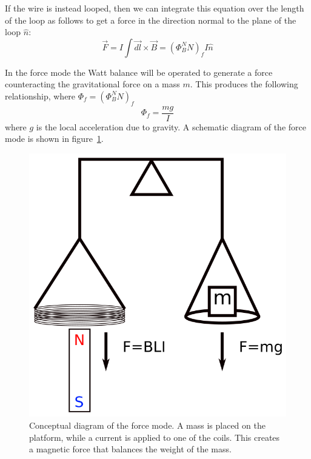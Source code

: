 \documentclass[aps,prstab,reprint,12pt]{revtex4-1}
\begin{document}
If the wire is instead looped, then we can integrate this equation over the length of the loop as follows to get a force in the direction normal to the plane of the loop $\hat{n}$:
\begin{equation}
    \vec{F} = I\int\vec{dl}\times\vec{B}  = (\Phi_B^N N)_fI \hat{n}
\end{equation}

In the force mode the Watt balance will be operated to generate a force counteracting the gravitational force on a mass $m$. This produces the following relationship, where $\Phi_f = (\Phi_B^NN)_f$
\begin{equation}\label{eq:force_equation}
    \Phi_f = \frac{mg}{I}
\end{equation}
where $g$ is the local acceleration due to gravity. A schematic diagram of the force mode is shown in figure~\ref{fig:fmode-concept}.



\begin{figure}[b]
    \centering
    \includegraphics[width=0.6\linewidth]{figs/watt-balance-fmode.png}
    \caption{Conceptual diagram of the force mode. A mass is placed on the platform, while a current is applied to one of the coils. This creates a magnetic force that balances the weight of the mass.}
    \label{fig:fmode-concept}
\end{figure}
\end{document}
